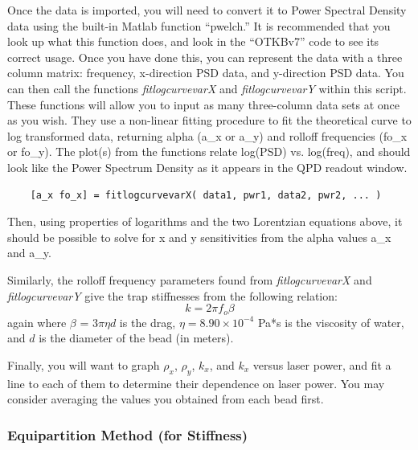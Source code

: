 \documentclass{../lab}
\begin{document}
Once the data is imported, you will need to convert it to Power Spectral Density data using the built-in Matlab function ``pwelch.'' It is recommended that you look up what this function does, and look in the ``OTKBv7'' code to see its correct usage. Once you have done this, you can represent the data with a three column matrix: frequency, x-direction PSD data, and y-direction PSD data. You can then call the functions \emph{fitlogcurvevarX} and \emph{fitlogcurvevarY} within this script. These functions will allow you to input as many three-column data sets at once as you wish. They use a non-linear fitting procedure to fit the theoretical curve to log transformed data, returning alpha (a\_x or a\_y) and rolloff frequencies (fo\_x or fo\_y). The plot(s) from the functions relate log(PSD) vs. log(freq), and should look like the Power Spectrum Density as it appears in the QPD readout window.
\begin{verbatim}
    [a_x fo_x] = fitlogcurvevarX( data1, pwr1, data2, pwr2, ... )
\end{verbatim}
Then, using properties of logarithms and the two Lorentzian equations above, it should be possible to solve for x and y sensitivities from the alpha values a\_x and a\_y.

Similarly, the rolloff frequency parameters found from \emph{fitlogcurvevarX} and \emph{fitlogcurvevarY} give the trap stiffnesses from the following relation:
\[
    k = 2 \pi f_o \beta
\]
again where $\beta$ = $3\pi\eta d$  is the drag, $\eta = 8.90 \times 10^{-4}$ Pa*s is the viscosity of water, and $d$ is the diameter of the bead (in meters).

Finally, you will want to graph $\rho_x$, $\rho_y$, $k_x$, and $k_x$ versus laser power, and fit a line to each of them to determine their dependence on laser power. You may consider averaging the values you obtained from each bead first.



\subsubsection{Equipartition Method (for Stiffness)}
\end{document}
